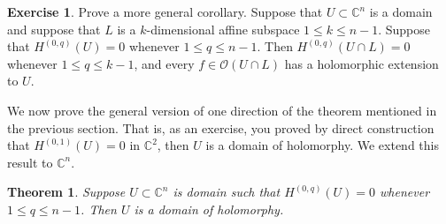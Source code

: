 \documentclass[12pt,openany]{book}
\newcommand{\C}{{\mathbb{C}}}
\newcommand{\sO}{{\mathscr{O}}}
\theoremstyle{plain}
\newtheorem{thm}{Theorem}[section]
\theoremstyle{remark}
\theoremstyle{definition}
\newenvironment{exbox}{%
    \def\FrameCommand{\vrule width 1pt \relax\hspace{10pt}}%
    \MakeFramed{\advance\hsize-\width\FrameRestore}%
}{%
    \endMakeFramed
}
\theoremstyle{exercise}
\newtheorem{exercise}{Exercise}[section]
\theoremstyle{example}
\begin{document}
\begin{exbox}
\begin{exercise}
Prove a more general corollary.
Suppose that $U \subset \C^n$ is a domain and suppose that
$L$ is a $k$-dimensional affine subspace $1 \leq k \leq n-1$.
Suppose that $H^{(0,q)}(U) = 0$ whenever $1 \leq q \leq n-1$.  Then
$H^{(0,q)}(U \cap L) = 0$ whenever $1 \leq q \leq k-1$,
and every $f \in \sO(U \cap L)$ has a holomorphic extension to $U$.
\end{exercise}
\end{exbox}

We now prove the general version of one direction of the theorem mentioned
in the previous section.  That is, as an exercise, you proved by direct
construction that $H^{(0,1)}(U) = 0$ in $\C^2$, then $U$ is a domain of
holomorphy.  We extend this result to $\C^n$.

\begin{thm} \label{thm:dolhomimpliesdoh}
Suppose $U \subset \C^n$ is domain such that $H^{(0,q)}(U) = 0$
whenever $1 \leq q \leq n-1$.  Then $U$ is a domain of holomorphy.
\end{thm}
\end{document}
